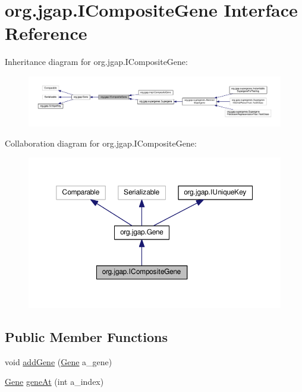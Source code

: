 \hypertarget{interfaceorg_1_1jgap_1_1_i_composite_gene}{\section{org.\-jgap.\-I\-Composite\-Gene Interface Reference}
\label{interfaceorg_1_1jgap_1_1_i_composite_gene}
}


Inheritance diagram for org.\-jgap.\-I\-Composite\-Gene\-:
\nopagebreak
\begin{figure}[H]
\begin{center}
\leavevmode
\includegraphics[width=350pt]{interfaceorg_1_1jgap_1_1_i_composite_gene__inherit__graph}
\end{center}
\end{figure}


Collaboration diagram for org.\-jgap.\-I\-Composite\-Gene\-:
\nopagebreak
\begin{figure}[H]
\begin{center}
\leavevmode
\includegraphics[width=350pt]{interfaceorg_1_1jgap_1_1_i_composite_gene__coll__graph}
\end{center}
\end{figure}
\subsection*{Public Member Functions}
\begin{DoxyCompactItemize}
\item 
void \hyperlink{interfaceorg_1_1jgap_1_1_i_composite_gene_a28fc3a076dc6983c39108dc10751596d}{add\-Gene} (\hyperlink{interfaceorg_1_1jgap_1_1_gene}{Gene} a\-\_\-gene)
\item 
\hyperlink{interfaceorg_1_1jgap_1_1_gene}{Gene} \hyperlink{interfaceorg_1_1jgap_1_1_i_composite_gene_adad062c4c8453eb4bfafd2d7c8abd1fb}{gene\-At} (int a\-\_\-index)
\end{DoxyCompactItemize}

